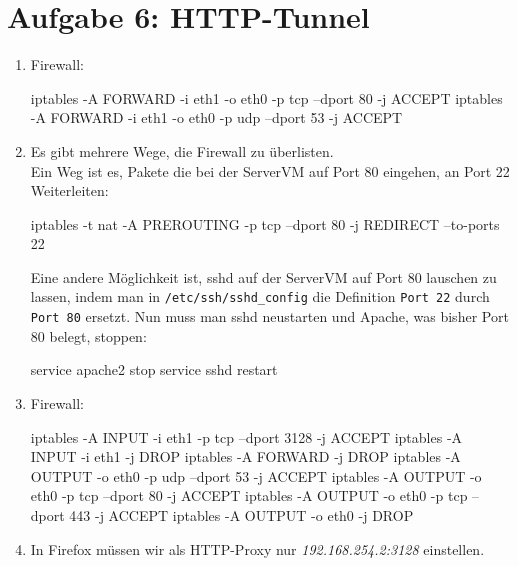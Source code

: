 \documentclass[a4paper,10pt]{scrartcl}
\begin{document}
\section*{Aufgabe 6: HTTP-Tunnel}
\label{sec:Aufgabe 6: HTTP-Tunnel}
\begin{enumerate}[\bfseries 1.]
	\item
        Firewall:
        \begin{rootcommands}
iptables -A FORWARD -i eth1 -o eth0 -p tcp --dport 80 -j ACCEPT
iptables -A FORWARD -i eth1 -o eth0 -p udp --dport 53 -j ACCEPT
		\end{rootcommands}

	\item
        Es gibt mehrere Wege, die Firewall zu überlisten.\\
        Ein Weg ist es, Pakete die bei der ServerVM auf Port 80 eingehen,
        an Port 22 Weiterleiten:
		\begin{rootcommands}
iptables -t nat -A PREROUTING -p tcp --dport 80 -j REDIRECT --to-ports 22
		\end{rootcommands}

        Eine andere Möglichkeit ist, sshd auf der ServerVM auf Port 80 lauschen
        zu lassen, indem man in \texttt{/etc/ssh/sshd\_config} die Definition
        \texttt{Port 22} durch \texttt{Port 80} ersetzt. Nun muss man sshd neustarten
        und Apache, was bisher Port 80 belegt, stoppen:

        \begin{rootcommands}
service apache2 stop
service sshd restart
        \end{rootcommands}

	\item
        Firewall:
	    \begin{rootcommands}
iptables -A INPUT -i eth1 -p tcp --dport 3128 -j ACCEPT
iptables -A INPUT -i eth1 -j DROP
iptables -A FORWARD -j DROP
iptables -A OUTPUT -o eth0 -p udp --dport 53 -j ACCEPT
iptables -A OUTPUT -o eth0 -p tcp --dport 80 -j ACCEPT
iptables -A OUTPUT -o eth0 -p tcp --dport 443 -j ACCEPT
iptables -A OUTPUT -o eth0 -j DROP
	    \end{rootcommands}

	\item
        In Firefox müssen wir als HTTP-Proxy nur \textit{192.168.254.2:3128}
        einstellen.


\end{enumerate}
\end{document}
